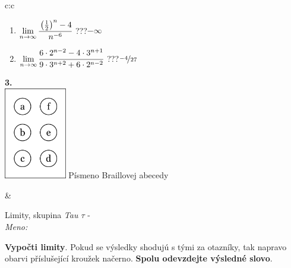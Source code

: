 \documentclass[10pt]{report}
\begin{document}
\begin{tabular}{c:c}
\begin{minipage}[c][104.5mm][t]{0.5\linewidth}
\begin{center}
\begin{minipage}{0.79\linewidth}
\begin{center}
\begin{varwidth}{\linewidth}
\begin{enumerate}
\item $\lim\limits_{n\to\infty}\cfrac{\left(\frac{1}{2}\right)^n -4}{n^{-6}}$\quad \dotfill\; ???\;\dotfill \quad $-\infty$
\item $\lim\limits_{n\to\infty}\cfrac{6\cdot 2^{n-2}-4\cdot 3^{n+1}}{9\cdot 3^{n+2}+6\cdot 2^{n-2}}$\quad \dotfill\; ???\;\dotfill \quad $\nicefrac{-4}{27}$
\end{enumerate}
\end{varwidth}
\end{center}
\end{minipage}
\begin{minipage}{0.20\linewidth}
\begin{center}
{\Huge\bfseries 3.} \\[2mm]
\includegraphics[height=40mm]{../images/braille.png}
{\small Písmeno Braillovej abecedy}
\end{center}
\end{minipage}
\end{center}
\end{minipage}
&
\begin{minipage}[c][104.5mm][t]{0.5\linewidth}
\begin{center}
\vspace{7mm}
{\huge Limity, skupina \textit{Tau $\tau$} -}\\[5mm]
\textit{Meno:}\phantom{xxxxxxxxxxxxxxxxxxxxxxxxxxxxxxxxxxxxxxxxxxxxxxxxxxxxxxxxxxxxxxxxx}\\[5mm]
\begin{minipage}{0.95\linewidth}
\begin{center}
\textbf{Vypočti limity}. Pokud se výsledky shodujú s tými za otazníky, tak napravo\\obarvi příslušející kroužek načerno. \textbf{Spolu odevzdejte výsledné slovo}.
\end{center}
\end{minipage}
\\[1mm]
\begin{minipage}{0.79\linewidth}
\begin{center}
\begin{varwidth}{\linewidth}

\end{varwidth}
\end{center}
\end{minipage}
\end{center}
\end{minipage}
\end{tabular}
\end{document}
